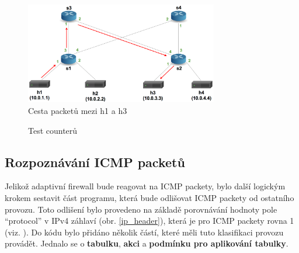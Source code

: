 \documentclass[czech, 11pt]{article}
\begin{document}
    \begin{figure}[H]
		\centering
		\includegraphics[width=0.75\textwidth,height=\textheight,keepaspectratio]{Figures/pod_topo_counter_test.png}
		\caption{Cesta packetů mezi h1 a h3}
		\label{pod_topo_counter_test}
	\end{figure}

    \begin{figure}[H]
        \centering
        
        
        \caption{Test counterů}
        \label{counter_test}
    \end{figure}

    \subsection{Rozpoznávání ICMP packetů}
    Jelikož adaptivní firewall bude reagovat na ICMP packety, bylo další logickým krokem sestavit část programu, která bude odlišovat ICMP packety od ostatního provozu. Toto odlišení bylo provedeno na základě porovnávání hodnoty pole \enquote{protocol} v IPv4 záhlaví (obr. \ref{ip_header}), která je pro ICMP packety rovna 1 (viz. \cite{ip_protocols}). Do kódu bylo přidáno několik částí, které měli tuto klasifikaci provozu provádět. Jednalo se o \textbf{tabulku}, \textbf{akci} a \textbf{podmínku pro aplikování tabulky}.
\end{document}
